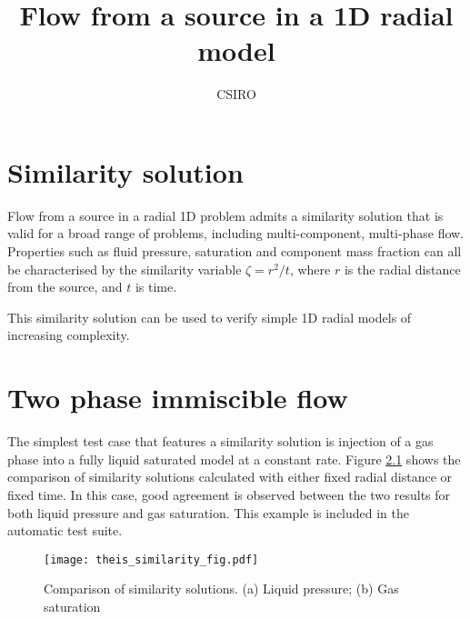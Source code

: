 \documentclass[]{report}
\begin{document}
\title{Flow from a source in a 1D radial model}
\author{CSIRO}
\maketitle

\tableofcontents

\chapter{Similarity solution}

Flow from a source in a radial 1D problem admits a similarity solution that is valid for a
broad range of problems, including multi-component, multi-phase flow. Properties such as fluid
pressure, saturation and component mass fraction can all be characterised by the similarity
variable $\zeta = r^2/t$, where $r$ is the radial distance from the source, and $t$ is time.

This similarity solution can be used to verify simple 1D radial models of increasing complexity.

\chapter{Two phase immiscible flow}

The simplest test case that features a similarity solution is injection of a gas phase into a fully liquid
saturated model at a constant rate. Figure \ref{fig:theis_similarity_fig} shows the comparison of
similarity solutions calculated with either fixed radial distance or fixed time. In this case, good agreement
is observed between the two results for both liquid pressure and gas saturation. This example is included
in the automatic test suite.

\begin{figure}[htb]
\centering
\texttt{[image: theis\_similarity\_fig.pdf]}
\caption{Comparison of similarity solutions. (a) Liquid pressure; (b) Gas saturation}
\label{fig:theis_similarity_fig}
\end{figure}
\end{document}
